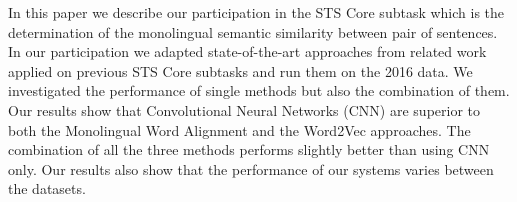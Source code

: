 In this paper we describe our participation in the STS Core subtask which is the determination of the monolingual semantic similarity between pair of sentences. In our participation we adapted state-of-the-art approaches from related work applied on previous STS Core subtasks and run them on the 2016 data. We investigated the performance of single methods but also the combination of them. Our results show that Convolutional Neural Networks (CNN) are superior to both the Monolingual Word Alignment and the Word2Vec approaches. The combination of all the three methods performs slightly better than using CNN only. Our results also show that the performance of our systems varies between the datasets.
